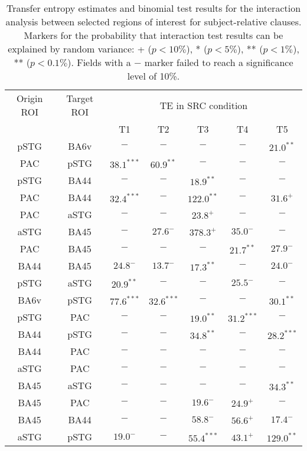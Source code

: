 \begin{table}[h]
\begin{center}
\begin{tabular}{ccccccc}
Origin ROI & Target ROI & \multicolumn{5}{c}{TE in SRC condition} \\
           &            &      T1 & T2 & T3 & T4 & T5             \\ \hline

pSTG & BA6v & $-$ & $-$ & $-$ & $-$ & $21.0^{**}$ \\ 
PAC & pSTG & $38.1^{***}$ & $60.9^{**}$ & $-$ & $-$ & $-$ \\ 
pSTG & BA44 & $-$ & $-$ & $18.9^{**}$ & $-$ & $-$ \\ 
PAC & BA44 & $32.4^{***}$ & $-$ & $122.0^{**}$ & $-$ & $31.6^{+}$ \\ 
PAC & aSTG & $-$ & $-$ & $23.8^{+}$ & $-$ & $-$ \\ 
aSTG & BA45 & $-$ & $27.6^{-}$ & $378.3^{+}$ & $35.0^{-}$ & $-$ \\ 
PAC & BA45 & $-$ & $-$ & $-$ & $21.7^{**}$ & $27.9^{-}$ \\ 
BA44 & BA45 & $24.8^{-}$ & $13.7^{-}$ & $17.3^{**}$ & $-$ & $24.0^{-}$ \\ 
pSTG & aSTG & $20.9^{**}$ & $-$ & $-$ & $25.5^{-}$ & $-$ \\ 
BA6v & pSTG & $77.6^{***}$ & $32.6^{***}$ & $-$ & $-$ & $30.1^{**}$ \\ 
pSTG & PAC & $-$ & $-$ & $19.0^{**}$ & $31.2^{***}$ & $-$ \\ 
BA44 & pSTG & $-$ & $-$ & $34.8^{**}$ & $-$ & $28.2^{***}$ \\ 
BA44 & PAC & $-$ & $-$ & $-$ & $-$ & $-$ \\ 
aSTG & PAC & $-$ & $-$ & $-$ & $-$ & $-$ \\ 
BA45 & aSTG & $-$ & $-$ & $-$ & $-$ & $34.3^{**}$ \\ 
BA45 & PAC & $-$ & $-$ & $19.6^{-}$ & $24.9^{+}$ & $-$ \\ 
BA45 & BA44 & $-$ & $-$ & $58.8^{-}$ & $56.6^{+}$ & $17.4^{-}$ \\ 
aSTG & pSTG & $19.0^{-}$ & $-$ & $55.4^{***}$ & $43.1^{+}$ & $129.0^{**}$ \\ 
\end{tabular}
\caption{\label{4.4.TEvalues.b} Transfer entropy estimates and binomial test results for the interaction analysis between selected regions of interest for subject-relative clauses. Markers for the probability that interaction test results can be explained by random variance: + ($p < 10\%$), * ($p < 5\%$), ** ($p < 1\%$), ** ($p < 0.1\%$). Fields with a $-$ marker failed to reach a significance level of 10\%.}
\end{center}
\end{table}
\vspace{5mm}



